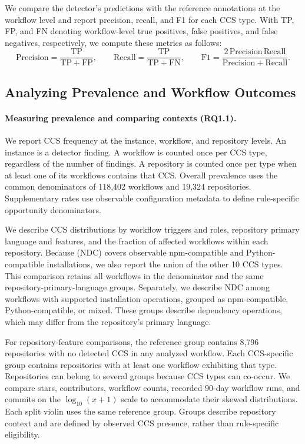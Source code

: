 \documentclass[smallextended]{svjour3}
\begin{document}
We compare the detector's predictions with the reference annotations at the workflow level and report precision, recall, and F1 for each CCS type. With TP, FP, and FN denoting workflow-level true positives, false positives, and false negatives, respectively, we compute these metrics as follows:
\[
\mathrm{Precision}=\frac{\mathrm{TP}}{\mathrm{TP}+\mathrm{FP}},\qquad
\mathrm{Recall}=\frac{\mathrm{TP}}{\mathrm{TP}+\mathrm{FN}},\qquad
\mathrm{F1}=\frac{2\,\mathrm{Precision}\,\mathrm{Recall}}
{\mathrm{Precision}+\mathrm{Recall}}.
\]

\subsection{Analyzing Prevalence and Workflow Outcomes}
\label{sec:analysis-methods}

\paragraph{Measuring prevalence and comparing contexts (RQ1.1).}

We report CCS frequency at the instance, workflow, and repository levels. An instance is a detector finding. A workflow is counted once per CCS type, regardless of the number of findings. A repository is counted once per type when at least one of its workflows contains that CCS. Overall prevalence uses the common denominators of 118,402 workflows and 19,324 repositories. Supplementary rates use observable configuration metadata to define rule-specific opportunity denominators.

We describe CCS distributions by workflow triggers and roles, repository primary language and features, and the fraction of affected workflows within each repository. Because  (NDC) covers observable npm-compatible and Python-compatible installations, we also report the union of the other 10 CCS types. This comparison retains all workflows in the denominator and the same repository-primary-language groups. Separately, we describe NDC among workflows with supported installation operations, grouped as npm-compatible, Python-compatible, or mixed. These groups describe dependency operations, which may differ from the repository's primary language.

For repository-feature comparisons, the reference group contains 8,796 repositories with no detected CCS in any analyzed workflow. Each CCS-specific group contains repositories with at least one workflow exhibiting that type. Repositories can belong to several groups because CCS types can co-occur. We compare stars, contributors, workflow counts, recorded 90-day workflow runs, and commits on the $\log_{10}(x+1)$ scale to accommodate their skewed distributions. Each split violin uses the same reference group. Groups describe repository context and are defined by observed CCS presence, rather than rule-specific eligibility.
\end{document}
